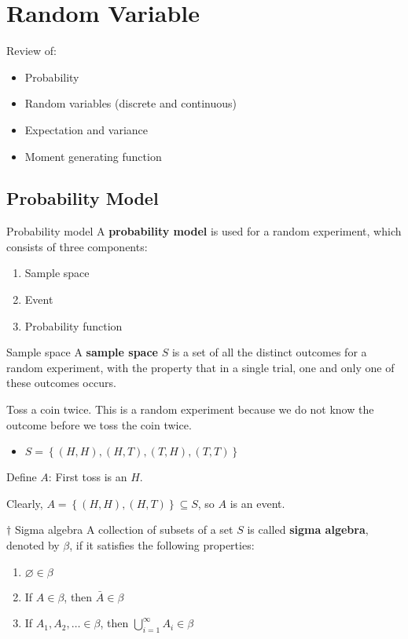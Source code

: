 \setcounter{chapter}{1}
\chapter{Random Variable}
Review of:
\begin{itemize}
    \item Probability
    \item Random variables (discrete and continuous)
    \item Expectation and variance
    \item Moment generating function
\end{itemize}

\section{Probability Model}
\begin{Definition}{Probability model}{}
    A \textbf{probability model} is used for a random
    experiment, which consists of three components:
    \begin{enumerate}[label=(\Roman*)]
        \item Sample space
        \item Event
        \item Probability function
    \end{enumerate}
\end{Definition}

\begin{Definition}{Sample space}{}
    A \textbf{sample space} $ S $ is a set of all the distinct outcomes
    for a random experiment, with the property that in a single trial,
    one and only one of these outcomes occurs.
\end{Definition}

\begin{Example}{}{}
    Toss a coin twice. This is a random experiment because
    we do not know the outcome before we toss the coin twice.
    \begin{itemize}
        \item $ S=\left\{ (H,H),(H,T),(T,H),(T,T)\right\} $
    \end{itemize}
    Define $ A $: First toss is an $ H $.

    Clearly, $ A=\left\{ (H,H),(H,T)\right\}\subseteq S $, so $ A $ is an event.
\end{Example}

\begin{Definition}{$ \dagger $ Sigma algebra}{}
    A collection of subsets of a set $ S $ is called \textbf{sigma algebra},
    denoted by $ \beta $, if it satisfies the following properties:
    \begin{enumerate}[label=(\Roman*)]
        \item $ \varnothing\in \beta $
        \item If $ A\in\beta $, then $ \bar{A}\in\beta $
        \item If $ A_1,A_2,\ldots\in \beta $, then $ \bigcup\limits_{i=1}^{\infty}A_i\in \beta $
    \end{enumerate}
\end{Definition}

